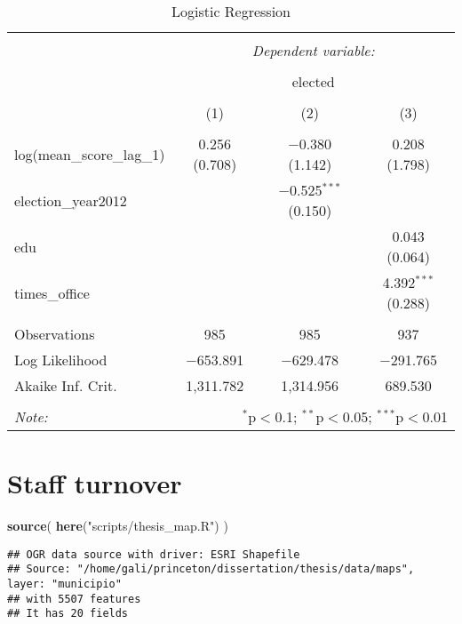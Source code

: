 \documentclass[12pt,]{book}
\newenvironment{Shaded}{\begin{snugshade}}{\end{snugshade}}
\newcommand{\KeywordTok}[1]{\textcolor[rgb]{0.13,0.29,0.53}{\textbf{#1}}}
\newcommand{\NormalTok}[1]{#1}
\newcommand{\StringTok}[1]{\textcolor[rgb]{0.31,0.60,0.02}{#1}}
\begin{document}
\begin{table}[!htbp] \centering 
  \caption{Logistic Regression} 
  \label{} 
\begin{tabular}{@{\extracolsep{5pt}}lccc} 
\\[-1.8ex]\hline 
\hline \\[-1.8ex] 
 & \multicolumn{3}{c}{\textit{Dependent variable:}} \\ 
\cline{2-4} 
\\[-1.8ex] & \multicolumn{3}{c}{elected} \\ 
\\[-1.8ex] & (1) & (2) & (3)\\ 
\hline \\[-1.8ex] 
 log(mean\_score\_lag\_1) & 0.256 (0.708) & $-$0.380 (1.142) & 0.208 (1.798) \\ 
  election\_year2012 &  & $-$0.525$^{***}$ (0.150) &  \\ 
  edu &  &  & 0.043 (0.064) \\ 
  times\_office &  &  & 4.392$^{***}$ (0.288) \\ 
 \hline \\[-1.8ex] 
Observations & 985 & 985 & 937 \\ 
Log Likelihood & $-$653.891 & $-$629.478 & $-$291.765 \\ 
Akaike Inf. Crit. & 1,311.782 & 1,314.956 & 689.530 \\ 
\hline 
\hline \\[-1.8ex] 
\textit{Note:}  & \multicolumn{3}{r}{$^{*}$p$<$0.1; $^{**}$p$<$0.05; $^{***}$p$<$0.01} \\ 
\end{tabular} 
\end{table}

\hypertarget{staff-turnover}{%
\chapter{Staff turnover}\label{staff-turnover}}

\begin{Shaded}
\begin{Highlighting}[]
\KeywordTok{source}\NormalTok{(}
  \KeywordTok{here}\NormalTok{(}\StringTok{"scripts/thesis_map.R"}\NormalTok{)}
\NormalTok{)}
\end{Highlighting}
\end{Shaded}

\begin{verbatim}
## OGR data source with driver: ESRI Shapefile 
## Source: "/home/gali/princeton/dissertation/thesis/data/maps", layer: "municipio"
## with 5507 features
## It has 20 fields
\end{verbatim}
\end{document}
